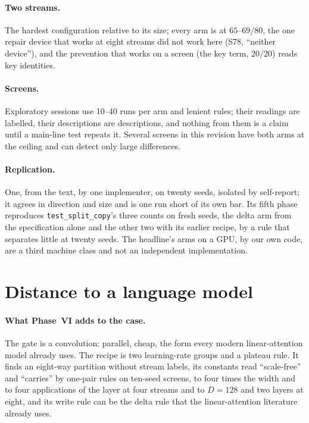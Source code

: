 \documentclass[11pt]{article}
\begin{document}
\paragraph{Two streams.} The hardest configuration relative to its size; every arm is at $65$--$69/80$, the one repair device that works at eight streams did not work here (S78, ``neither device''), and the prevention that works on a screen (the key term, $20/20$) reads key identities.

\paragraph{Screens.} Exploratory sessions use 10--40 runs per arm and lenient rules; their readings are labelled, their descriptions are descriptions, and nothing from them is a claim until a main-line test repeats it. Several screens in this revision have both arms at the ceiling and can detect only large differences.

\paragraph{Replication.} One, from the text, by one implementer, on twenty seeds, isolated by self-report; it agrees in direction and size and is one run short of its own bar. Its fifth phase reproduces \texttt{test\_split\_copy}'s three counts on fresh seeds, the delta arm from the specification alone and the other two with its earlier recipe, by a rule that separates little at twenty seeds. The headline's arms on a GPU, by our own code, are a third machine class and not an independent implementation.

\section{Distance to a language model}
\label{sec:lm}

\paragraph{What Phase~VI adds to the case.} The gate is a convolution: parallel, cheap, the form every modern linear-attention model already uses. The recipe is two learning-rate groups and a plateau rule. It finds an eight-way partition without stream labels, its constants read ``scale-free'' and ``carries'' by one-pair rules on ten-seed screens, to four times the width and to four applications of the layer at four streams and to $D = 128$ and two layers at eight, and its write rule can be the delta rule that the linear-attention literature already uses.
\end{document}
